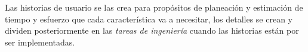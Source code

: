        Las historias de usuario se las crea para propósitos de planeación y estimación de tiempo y esfuerzo que cada característica va a necesitar, los detalles se crean y dividen posteriormente en las \emph{tareas de ingeniería} cuando las historias están por ser implementadas.






